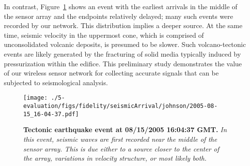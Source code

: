 In contrast, Figure~\ref{fig-jjTectonic} shows an event with the earliest
arrivals in the middle of the sensor array and the endpoints relatively
delayed; many such events were recorded by our network. 
This distribution implies a deeper source.  At the same time,
seismic velocity in the uppermost cone, which is comprised of unconsolidated
volcanic deposits, is presumed to be slower.  Such volcano-tectonic events
are likely generated by the fracturing of solid media typically induced
by pressurization within the edifice. This preliminary study
demonstrates the value of our wireless sensor network for collecting
accurate signals that can be subjected to seismological analysis.

\begin{figure}[t]
\begin{center}
\texttt{[image: ./5-evaluation/figs/fidelity/seismicArrival/johnson/2005-08-15\_16-04-37.pdf]}
\end{center}
\caption{\small{\bf Tectonic earthquake event at 08/15/2005 16:04:37
GMT.} {\em In this event, seismic waves are first recorded near the
middle of the sensor array. This is due either to a source closer 
to the center of the array, variations in velocity structure, 
or most likely both.}}
\label{fig-jjTectonic}
\end{figure}





